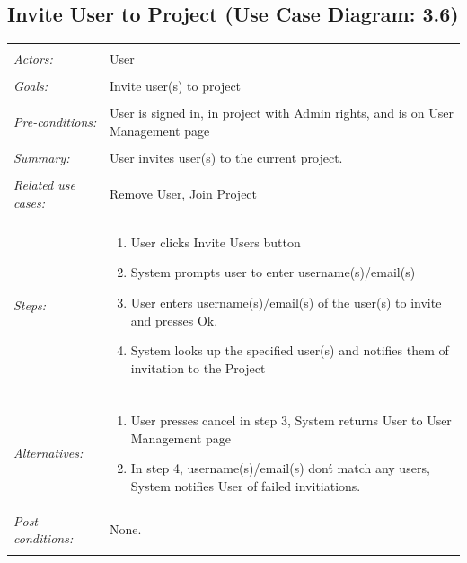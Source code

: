 \documentclass[11pt]{report}
\begin{document}
\subsection{Invite User to Project (Use Case Diagram: 3.6)}
\begin{tabular}{ p{2cm} p{12cm} }
    \hline
    \\
    \textit{Actors:} & User \\ 
    \\
    \textit{Goals:} & Invite user(s) to project \\
    \\
    \textit{Pre-conditions:} & User is signed in, in project with Admin rights, and is on User Management page \\
    \\
    \textit{Summary:} & User invites user(s) to the current project. \\ 
    \\
    \textit{Related use cases:} & Remove User, Join Project \\ 
    \\
    \textit{Steps:} & \begin{enumerate}
        \item User clicks Invite Users button
        \item System prompts user to enter username(s)/email(s)
        \item User enters username(s)/email(s) of the user(s) to invite and presses Ok.
        \item System looks up the specified user(s) and notifies them of invitation to the Project
    \end{enumerate} \\
    \\
    \textit{Alternatives:} & \begin{enumerate}
        \item User presses cancel in step 3, System returns User to User Management page
        \item In step 4, username(s)/email(s) don\'t match any users, System notifies User of failed invitiations.
    \end{enumerate} 
    \\
    \textit{Post-conditions:} & None. \\
    \\
    \hline
\end{tabular}
\end{document}
